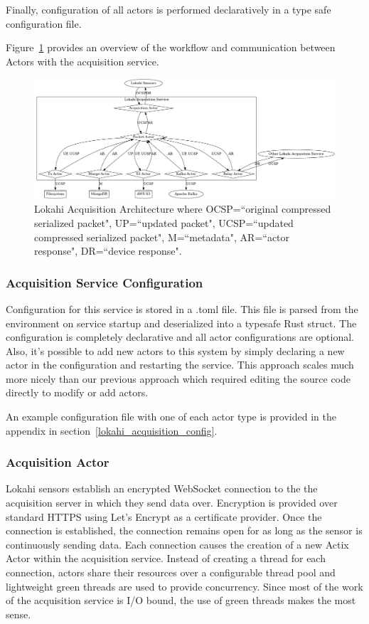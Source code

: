 Finally, configuration of all actors is performed declaratively in a type safe configuration file.

Figure~\ref{fig:LokahiAcquisition} provides an overview of the workflow and communication between Actors with the acquisition service.

\begin{figure}
	\centering
	\includegraphics[width=\linewidth]{figures/lokahi_acquisition.png}
	\caption{Lokahi Acquisition Architecture where OCSP=``original compressed serialized packet", UP=``updated packet", UCSP=``updated compressed serialized packet", M=``metadata", AR=``actor response", DR=``device response".}
	\label{fig:LokahiAcquisition}
\end{figure}

\subsubsection{Acquisition Service Configuration}

Configuration for this service is stored in a .toml file. This file is parsed from the environment on service startup and deserialized into a typesafe Rust struct. The configuration is completely declarative and all actor configurations are optional. Also, it's possible to add new actors to this system by simply declaring a new actor in the configuration and restarting the service. This approach scales much more nicely than our previous approach which required editing the source code directly to modify or add actors.

An example configuration file with one of each actor type is provided in the appendix in section~\ref{lokahi_acquisition_config}.

\subsubsection{Acquisition Actor}
Lokahi sensors establish an encrypted WebSocket connection to the the acquisition server in which they send data over. Encryption is provided over standard HTTPS using Let's Encrypt as a certificate provider. Once the connection is established, the connection remains open for as long as the sensor is continuously sending data. Each connection causes the creation of a new Actix Actor within the acquisition service. Instead of creating a thread for each connection, actors share their resources over a configurable thread pool and lightweight green threads are used to provide concurrency. Since most of the work of the acquisition service is I/O bound, the use of green threads makes the most sense.

